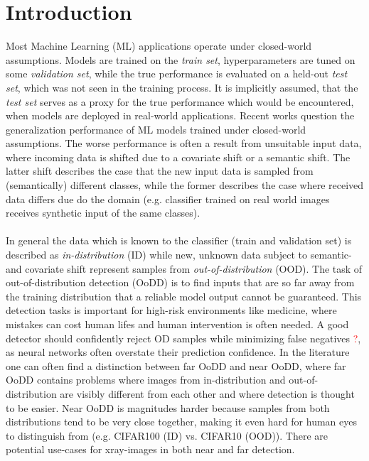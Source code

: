 \section{Introduction}
\raggedbottom

Most Machine Learning (ML) applications operate under closed-world assumptions.
Models are trained on the \textit{train set}, hyperparameters are tuned on some \textit{validation set}, while the true performance is evaluated on a held-out \textit{test set}, which was not seen in the training process.
It is implicitly assumed, that the \textit{test set} serves as a proxy for the true performance which would be encountered, when models are deployed in real-world applications.
Recent works question the generalization performance of ML models trained under closed-world assumptions.
The worse performance is often a result from unsuitable input data, where incoming data is shifted due to a covariate shift or a semantic shift.
The latter shift describes the case that the new input data is sampled from (semantically) different classes, while the former describes the case where received data differs due do the domain (e.g. classifier trained on real world images receives synthetic input of the same classes).
\\
\\
In general the data which is known to the classifier (train and validation set) is described as \textit{in-distribution} (ID) while new, unknown data subject to semantic- and covariate shift represent samples from \textit{out-of-distribution} (OOD).
The task of out-of-distribution detection (OoDD) is to find inputs that are so far away from the training distribution that a reliable model output cannot be guaranteed.
This detection tasks is important for high-risk environments like medicine, where mistakes can cost human lifes and human intervention is often needed.
A good detector should confidently reject OD samples while minimizing false negatives \textcolor{red}{?}, as neural networks often overstate their prediction confidence.
In the literature one can often find a distinction between far OoDD and near OoDD, where far OoDD contains problems where images from in-distribution and out-of-distribution are visibly different from each other and where detection is thought to be easier.
Near OoDD is magnitudes harder because samples from both distributions tend to be very close together, making it even hard for human eyes to distinguish from (e.g. CIFAR100 (ID) vs. CIFAR10 (OOD)).
There are potential use-cases for xray-images in both near and far detection.
